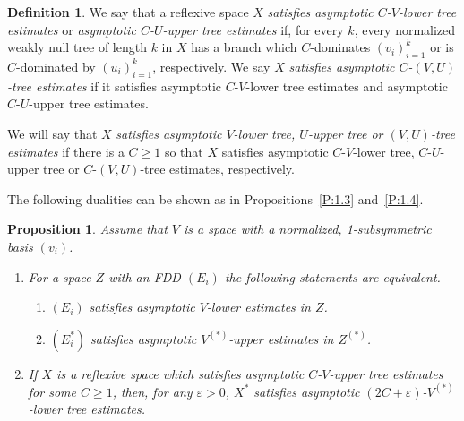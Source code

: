 \documentclass[11pt,leqno]{amsart}
\newtheorem{prop}[thm]{Proposition}
\theoremstyle{definition}
\newtheorem*{defin}{Definition}
\newcommand{\vp}{\varepsilon}
\newcommand{\Zs}{Z^{(*)}}
\newcommand{\Vs}{V^{(*)}}
\begin{document}
\begin{defin}
  We say that a reflexive space $X$ {\em satisfies asymptotic
    $C$-$V$-lower tree estimates }or {\em asymptotic $C$-$U$-upper
    tree estimates }if, for every $k$, every normalized weakly null
  tree of length $k$ in $X$ has a branch which $C$-dominates
  $(v_i)_{i=1}^k$ or is $C$-dominated by $(u_i)_{i=1}^k$,
  respectively. We say $X$ {\em satisfies asymptotic $C$-$(V,U)$-tree
    estimates }if it satisfies asymptotic $C$-$V$-lower tree estimates
  and asymptotic $C$-$U$-upper tree estimates.

  We will say  that $X$ {\em satisfies  asymptotic $V$-lower tree,
    $U$-upper tree or $(V,U)$-tree estimates }if there is a $C\ge 1$
  so that $X$ satisfies asymptotic $C$-$V$-lower tree, $C$-$U$-upper
  tree or $C$-$(V,U)$-tree estimates, respectively.
\end{defin}
The following dualities can be shown  as in Propositions~\ref{P:1.3}
and~\ref{P:1.4}.
\begin{prop}\label{P:4.0}
  Assume that $V$ is a space with a normalized, 1-subsymmetric basis
  $(v_i)$.
  \begin{enumerate}
  \item[a)]
    For a space $Z$ with an FDD $(E_i)$ the following statements are
    equivalent.
    \begin{enumerate}
    \item[1)]
      $(E_i)$ satisfies asymptotic $V$-lower estimates in $Z$.
    \item[2)]
      $(E^*_i)$ satisfies asymptotic $\Vs$-upper estimates in  $\Zs$.
    \end{enumerate}
  \item[b)]
    If $X$ is a reflexive space which satisfies asymptotic
    $C$-$V$-upper tree estimates for some $C\ge 1$, then, for any
    $\vp>0$, $X^*$ satisfies asymptotic $(2C+\vp)$-$\Vs$-lower tree
    estimates.
\end{enumerate}
\end{prop}
\end{document}
